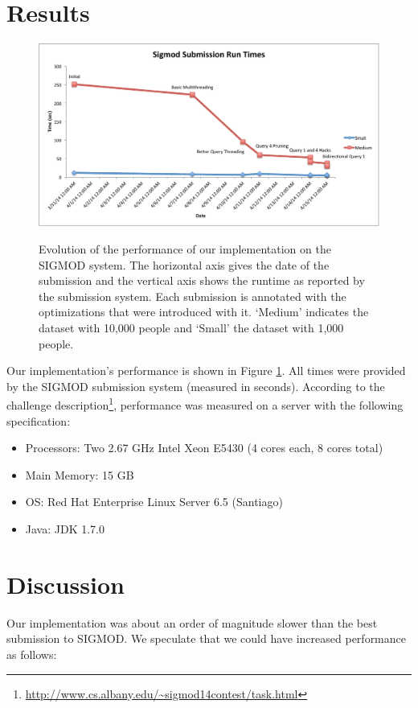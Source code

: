 \documentclass{article}
\begin{document}
\section{Results}
\label{sec:results}
\begin{figure}
  \centering
  \includegraphics[scale=0.5]{img/results.pdf}
  \label{fig:results}
  \caption{Evolution of the performance of our implementation on the
    SIGMOD system.  The horizontal axis gives the date of the
    submission and the vertical axis shows the runtime as
    reported by the submission system.  Each submission is annotated
    with the optimizations that were introduced with it.  `Medium'
    indicates the dataset with 10,000 people and `Small' the dataset
    with 1,000 people.}
\end{figure}

Our implementation's performance is shown in Figure \ref{fig:results}.  All times were provided by the SIGMOD submission system (measured in seconds).  According to the challenge description\footnote{\url{http://www.cs.albany.edu/~sigmod14contest/task.html}}, performance was measured on a server with the following specification:
\begin{itemize}
\item Processors: Two 2.67 GHz Intel Xeon E5430 (4 cores each, 8 cores total)
\item Main Memory: 15 GB
\item OS: Red Hat Enterprise Linux Server 6.5 (Santiago) 
\item Java: JDK 1.7.0
\end{itemize}

\section{Discussion}
Our implementation was about an order of magnitude slower than the
best submission to SIGMOD.  We speculate that we could have increased
performance as follows:
\end{document}
